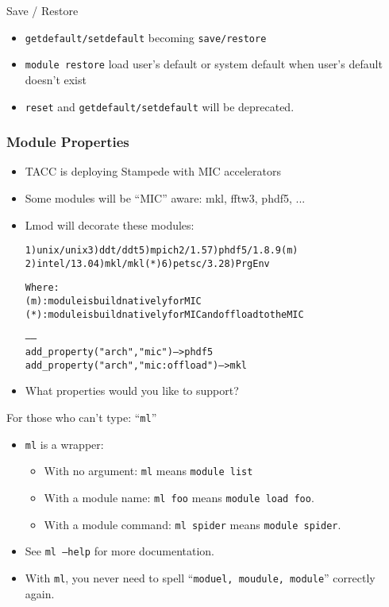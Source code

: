 \documentclass{beamer}
\begin{document}
\begin{frame}{Save / Restore}
  \begin{itemize}
    \item \texttt{getdefault/setdefault} becoming \texttt{save/restore}
    \item \texttt{module restore} load user's default or system
      default when user's default doesn't exist
    \item \texttt{reset} and \texttt{getdefault/setdefault} will be deprecated.
  \end{itemize}
\end{frame}

\begin{frame}[fragile]
    \frametitle{Module Properties}
  \begin{itemize}
    \item TACC is deploying Stampede with MIC accelerators
    \item Some modules will be ``MIC'' aware: mkl, fftw3, phdf5, ...
    \item Lmod will decorate these modules:
  {\tiny
    \begin{alltt}
  1) unix/unix     3) ddt/ddt       5) mpich2/1.5    7) {\color{blue}phdf5/1.8.9 (m)}
  2) intel/13.0    4) {\color{red}mkl/mkl (*)}   6) petsc/3.2     8) PrgEnv

  Where:
   {\color{blue}(m)}:  module is build natively for MIC
   {\color{red}(*)}:  module is build natively for MIC and offload to the MIC

   ------
   add_property("arch","mic")              -- > phdf5
   add_property("arch","mic:offload")      -- > mkl
    \end{alltt}
}
  \item What properties would you like to support?
  \end{itemize}
\end{frame}


\begin{frame}{For those who can't type: ``\texttt{ml}''}
  \begin{itemize}
    \item \texttt{ml} is a wrapper:
      \begin{itemize}
        \item With no argument: \texttt{ml} means \texttt{module list}
        \item With a module name: \texttt{ml foo} means \texttt{module
            load foo}.
        \item With a module command: \texttt{ml spider} means
          \texttt{module spider}.
      \end{itemize}
    \item See \texttt{ml --help} for more documentation.
    \item With \texttt{ml}, you never need to spell ``\texttt{moduel, moudule, module}''
      correctly again.
  \end{itemize}
\end{frame}
\end{document}
